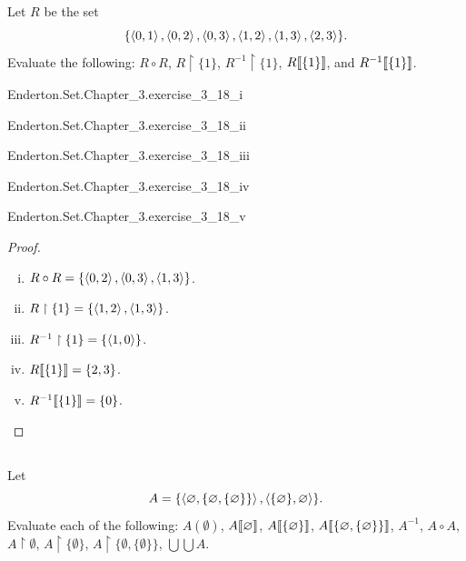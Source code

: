 \documentclass{report}
\begin{document}
\subsection{}%

  Let $R$ be the set
    $$\{ \left< 0, 1 \right>, \left< 0, 2 \right>, \left< 0, 3 \right>,
         \left< 1, 2 \right>, \left< 1, 3 \right>, \left< 2, 3 \right>\}.$$
  Evaluate the following: $R \circ R$, $R \restriction \{1\}$,
    $R^{-1} \restriction \{1\}$, $R\!\left\llbracket\{1\}\right\rrbracket$, and $R^{-1}\!\left\llbracket\{1\}\right\rrbracket$.

    {Enderton.Set.Chapter\_3.exercise\_3\_18\_i}

    {Enderton.Set.Chapter\_3.exercise\_3\_18\_ii}

    {Enderton.Set.Chapter\_3.exercise\_3\_18\_iii}

    {Enderton.Set.Chapter\_3.exercise\_3\_18\_iv}

    {Enderton.Set.Chapter\_3.exercise\_3\_18\_v}

  \begin{proof}
    \begin{enumerate}[(i)]
      \item $R \circ R = \{ \left< 0, 2 \right>, \left< 0, 3 \right>, \left< 1, 3 \right> \}$.
      \item $R \restriction \{1\} = \{ \left< 1, 2 \right>, \left< 1, 3 \right> \}$.
      \item $R^{-1} \restriction \{1\} = \{\left< 1, 0 \right>\}$.
      \item $R\!\left\llbracket\{1\}\right\rrbracket = \{2, 3\}$.
      \item $R^{-1}\!\left\llbracket\{1\}\right\rrbracket = \{0\}$.
    \end{enumerate}
  \end{proof}

\subsection{}%

  Let $$A = \{
    \left< \varnothing, \{\varnothing, \{\varnothing\}\} \right>,
    \left< \{\varnothing\}, \varnothing \right>
    \}.$$
  Evaluate each of the following: $A(\emptyset)$, $A\!\left\llbracket\varnothing\right\rrbracket$,
    $A\!\left\llbracket\{\varnothing\}\right\rrbracket$, $A\!\left\llbracket\{\varnothing, \{\varnothing\}\}\right\rrbracket$,
    $A^{-1}$, $A \circ A$, $A \restriction \emptyset$,
    $A \restriction \{\emptyset\}$,
    $A \restriction \{\emptyset, \{\emptyset\}\}$,
    $\bigcup\bigcup A$.
\end{document}
